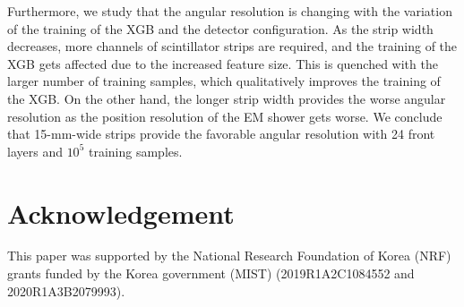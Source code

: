 \documentclass[preprint,12pt,times,a4paper]{elsarticle}
\begin{document}
Furthermore, we study that the angular resolution is changing with the variation of the training of the XGB and the detector configuration. As the strip width decreases, more channels of scintillator strips are required, and the training of the XGB gets affected due to the increased feature size. This is quenched with the larger number of training samples, which qualitatively improves the training of the XGB. On the other hand, the longer strip width provides the worse angular resolution as the position resolution of the EM shower gets worse. We conclude that 15-mm-wide strips provide the favorable angular resolution with 24 front layers and $10^{5}$ training samples.

\label{sec:con}


\section*{Acknowledgement}
This paper was supported by the National Research Foundation of Korea (NRF) grants funded by the Korea government (MIST) (2019R1A2C1084552 and \\ 2020R1A3B2079993).

\printbibliography
\end{document}
